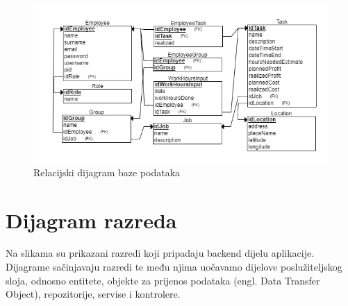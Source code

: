 				\begin{figure}[H]
					\centering
					\includegraphics[width=\textwidth]{slike/RelDijagram.png}
					\caption{Relacijski dijagram baze podataka}
				\end{figure}		
			\eject
			
			
		\section{Dijagram razreda}
		
			
			
			
			
			
			Na slikama su prikazani razredi koji pripadaju backend dijelu aplikacije. Dijagrame sačinjavaju razredi te među njima uočavamo dijelove poslužiteljskog sloja, odnosno entitete, objekte za prijenos podataka (engl. Data Transfer Object), repozitorije, servise i kontrolere.  

